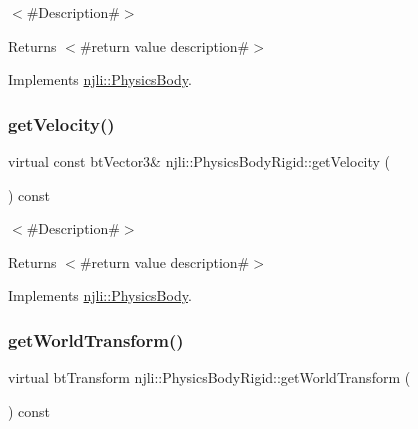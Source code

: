 $<$\#\+Description\#$>$

\begin{DoxyReturn}{Returns}
$<$\#return value description\#$>$ 
\end{DoxyReturn}


Implements \mbox{\hyperlink{classnjli_1_1_physics_body_a1338648bed55e4ca2d3c50d953fd60c4}{njli\+::\+Physics\+Body}}.

\mbox{\label{classnjli_1_1_physics_body_rigid_abbd7a0ea7ee539d9b84c64859ddf8406}} 
\subsubsection{\texorpdfstring{get\+Velocity()}{getVelocity()}}
{\footnotesize\ttfamily virtual const bt\+Vector3\& njli\+::\+Physics\+Body\+Rigid\+::get\+Velocity (\begin{DoxyParamCaption}{ }\end{DoxyParamCaption}) const\hspace{0.3cm}{\ttfamily [virtual]}}

$<$\#\+Description\#$>$

\begin{DoxyReturn}{Returns}
$<$\#return value description\#$>$ 
\end{DoxyReturn}


Implements \mbox{\hyperlink{classnjli_1_1_physics_body_add437a6d229dfbf74a838d0de7229867}{njli\+::\+Physics\+Body}}.

\mbox{\label{classnjli_1_1_physics_body_rigid_ad65b1292303642832a18f864bb23cff5}} 
\subsubsection{\texorpdfstring{get\+World\+Transform()}{getWorldTransform()}}
{\footnotesize\ttfamily virtual bt\+Transform njli\+::\+Physics\+Body\+Rigid\+::get\+World\+Transform (\begin{DoxyParamCaption}{ }\end{DoxyParamCaption}) const\hspace{0.3cm}{\ttfamily [virtual]}}

